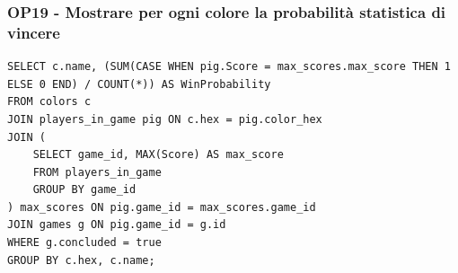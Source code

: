 \subsubsection*{OP19 - Mostrare per ogni colore la probabilità statistica di vincere}
\begin{lstlisting}[style=sql]
    SELECT c.name, (SUM(CASE WHEN pig.Score = max_scores.max_score THEN 1 ELSE 0 END) / COUNT(*)) AS WinProbability
FROM colors c
JOIN players_in_game pig ON c.hex = pig.color_hex
JOIN (
    SELECT game_id, MAX(Score) AS max_score
    FROM players_in_game
    GROUP BY game_id
) max_scores ON pig.game_id = max_scores.game_id
JOIN games g ON pig.game_id = g.id
WHERE g.concluded = true
GROUP BY c.hex, c.name;
\end{lstlisting}
